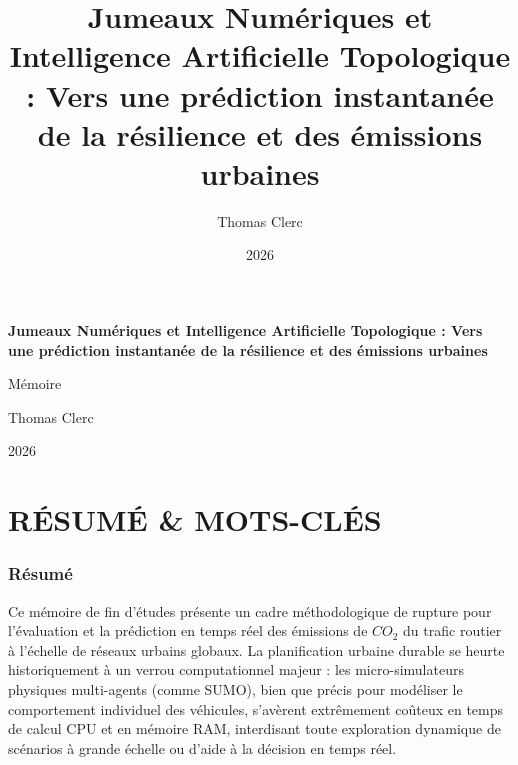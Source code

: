 \documentclass[10pt, a4paper]{article}
\title{Jumeaux Numériques et Intelligence Artificielle Topologique :
Vers une prédiction instantanée de la résilience et des émissions
urbaines}
\author{Thomas Clerc}
\date{2026}
\begin{document}
\begin{titlepage}
\centering
\vspace*{2cm}
{\Huge\bfseries Jumeaux Numériques et Intelligence Artificielle
Topologique : Vers une prédiction instantanée de la résilience et des
émissions urbaines\par}
\vspace{1.5cm}
{\Large Mémoire\par}
\vspace{1cm}
{\large Thomas Clerc\par}
\vspace{0.5cm}
{\large 2026\par}
\vfill
\end{titlepage}

\tableofcontents
\newpage

\section{RÉSUMÉ \& MOTS-CLÉS}\label{ruxe9sumuxe9-mots-cluxe9s}

\subsubsection{Résumé}\label{ruxe9sumuxe9}

Ce mémoire de fin d'études présente un cadre méthodologique de rupture
pour l'évaluation et la prédiction en temps réel des émissions de
\(CO_2\) du trafic routier à l'échelle de réseaux urbains globaux. La
planification urbaine durable se heurte historiquement à un verrou
computationnel majeur : les micro-simulateurs physiques multi-agents
(comme SUMO), bien que précis pour modéliser le comportement individuel
des véhicules, s'avèrent extrêmement coûteux en temps de calcul CPU et
en mémoire RAM, interdisant toute exploration dynamique de scénarios à
grande échelle ou d'aide à la décision en temps réel.
\end{document}

